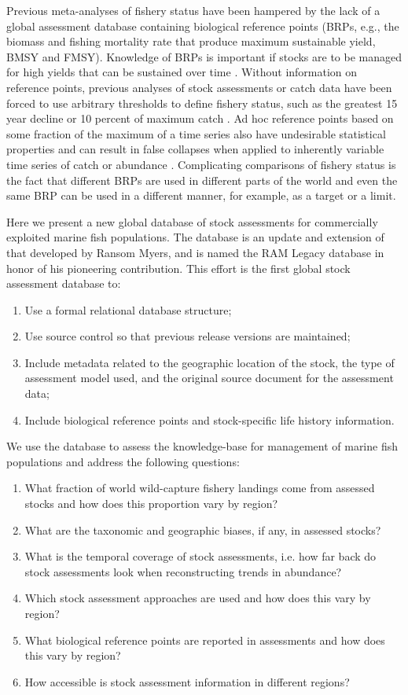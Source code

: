 \documentclass[letterpaper,12pt]{article}
\begin{document}
Previous meta-analyses of fishery status have been hampered by the
lack of a global assessment database containing biological reference
points (BRPs, e.g., the biomass and fishing mortality rate that
produce maximum sustainable yield, BMSY and FMSY).  Knowledge of BRPs
is important if stocks are to be managed for high yields that can be
sustained over time \citep{Mace:1994:cjfas}.  Without information on
reference points, previous analyses of stock assessments or catch data
have been forced to use arbitrary thresholds to define fishery status,
such as the greatest 15 year decline \citep{Hutchings:Reynolds:2004:biosci} or
10 percent of maximum catch \citep{Worm:etal:2006:science}. Ad hoc reference
points based on some fraction of the maximum of a time series also
have undesirable statistical properties and can result in false
collapses when applied to inherently variable time series of catch or
abundance \citep{Wilberg:Miller:2007:science, branch:2008:marpol}.
Complicating comparisons of fishery status is the fact that different
BRPs are used in different parts of the world and even the same BRP
can be used in a different manner, for example, as a target or a
limit.

Here we present a new global database of stock assessments for
commercially exploited marine fish populations.  The database is an
update and extension of that developed by Ransom Myers, and is named
the RAM Legacy database in honor of his pioneering contribution.  This
effort is the first global stock assessment database to:
\begin{enumerate}
\item Use a formal relational database structure;
\item Use source control so that previous release versions are maintained;
\item Include metadata related to the geographic location of the stock, the type of assessment model used, and the original source document for the assessment data;
\item Include biological reference points and stock-specific life history information. 
\end{enumerate}

We use the database to assess the knowledge-base for management of marine fish populations and address the following questions:
\begin{enumerate}
\item What fraction of world wild-capture fishery landings come from assessed stocks and how does this proportion vary by region?
\item What are the taxonomic and geographic biases, if any, in assessed stocks?
\item What is the temporal coverage of stock assessments, i.e. how far back do stock assessments look when reconstructing trends in abundance?
\item Which stock assessment approaches are used and how does this vary by region?
\item What biological reference points are reported in assessments and how does this vary by region?
\item How accessible is stock assessment information in different regions?
\end{enumerate}
\end{document}
